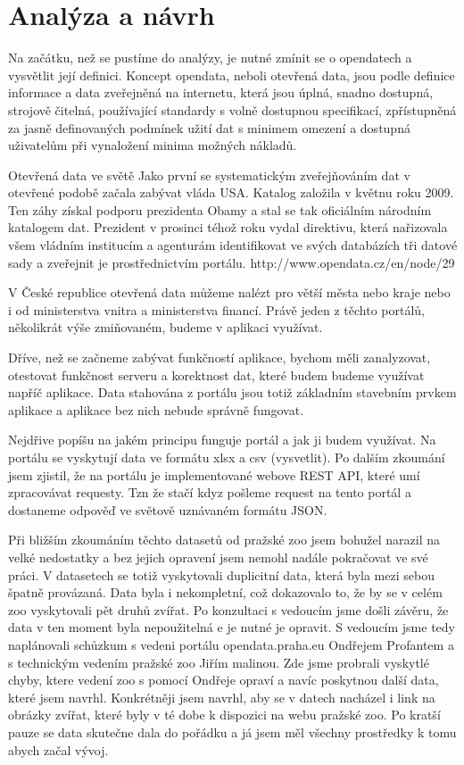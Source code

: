 \documentclass[thesis=B,czech]{FITthesis}[2012/06/26]
\begin{document}
\chapter{Analýza a návrh}
Na začátku, než se pustíme do analýzy, je nutné zmínit se o opendatech a vysvětlit její definici.
Koncept opendata, neboli otevřená data, jsou podle definice informace a data zveřejněná na internetu, která jsou úplná, snadno dostupná, strojově čitelná, používající standardy s volně dostupnou specifikací, zpřístupněná za jasně definovaných podmínek užití dat s minimem omezení a dostupná uživatelům při vynaložení minima možných nákladů.   

Otevřená data ve světě
Jako první se systematickým zveřejňováním dat v otevřené podobě začala zabývat vláda USA. Katalog založila v květnu roku 2009. Ten záhy získal podporu prezidenta Obamy a stal se tak oficiálním národním katalogem dat. Prezident v prosinci téhož roku vydal direktivu, která nařizovala všem vládním institucím a agenturám identifikovat ve svých databázích tři datové sady a zveřejnit je prostřednictvím portálu.
http://www.opendata.cz/en/node/29

V České republice otevřená data můžeme nalézt pro větší města nebo kraje nebo i od ministerstva vnitra a ministerstva financí. Právě jeden z těchto portálů, několikrát výše zmiňovaném, budeme v aplikaci využívat.

Dříve, než se začneme zabývat funkčností aplikace, bychom měli zanalyzovat, otestovat funkčnost serveru a korektnost dat, které budem budeme využívat napříč aplikace. Data stahována z portálu jsou totiž základním stavebním prvkem aplikace a aplikace bez nich nebude správně fungovat.

Nejdřive popíšu na jakém principu funguje portál a jak ji budem využívat. Na portálu se vyskytují data ve formátu xlsx a csv (vysvetlit). Po dalším zkoumání jsem zjistil, že na portálu je implementované webove REST API, které umí zpracovávat requesty. Tzn že stačí kdyz pošleme request na tento portál a dostaneme odpověď ve světově uznávaném formátu JSON.

Při bližším zkoumáním těchto datasetů od pražské zoo jsem bohužel narazil na velké nedostatky a bez jejich opravení jsem nemohl nadále pokračovat ve své práci. V datasetech se totiž vyskytovali duplicitní  data, která byla mezi sebou špatně provázaná. Data byla i nekompletní, což dokazovalo to, že by se v celém zoo vyskytovali pět druhů zvířat. Po konzultaci s vedoucím jsme došli závěru, že data v ten moment byla nepoužitelná e je nutné je opravit. 
S vedoucím jsme tedy naplánovali schůzkum s vedeni portálu opendata.praha.eu Ondřejem Profantem a s technickým vedením pražské zoo Jiřím malinou. Zde jsme probrali vyskytlé chyby, ktere vedení zoo s pomocí Ondřeje opraví a navíc poskytnou další data, které jsem navrhl. Konkrétněji jsem navrhl, aby se v datech nacházel i link na obrázky zvířat, které byly v té dobe k dispozici na webu pražské zoo. Po kratší pauze se data skutečne dala do pořádku a já jsem měl všechny prostředky k tomu abych začal vývoj.
\end{document}
